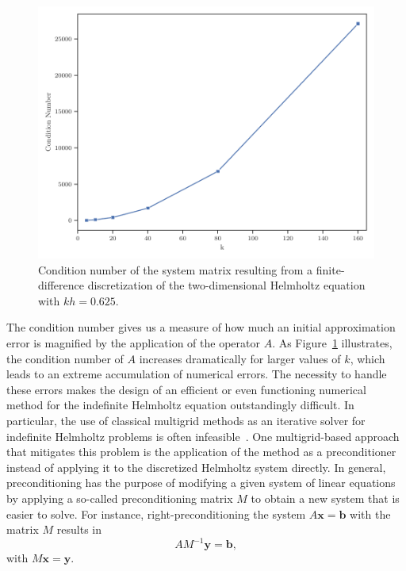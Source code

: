 \begin{figure}
		\includegraphics[scale=0.725]{figures/cond.pdf}
		\caption{Condition number of the system matrix resulting from a finite-difference discretization of the two-dimensional Helmholtz equation with $kh = 0.625$.}
		\label{fig:condition-number-helmholtz}
\end{figure}
The condition number gives us a measure of how much an initial approximation error is magnified by the application of the operator $A$.
As Figure~\ref{fig:condition-number-helmholtz} illustrates, the condition number of $A$ increases dramatically for larger values of $k$, which leads to an extreme accumulation of numerical errors. 
The necessity to handle these errors makes the design of an efficient or even functioning numerical method for the indefinite Helmholtz equation outstandingly difficult.
In particular, the use of classical multigrid methods as an iterative solver for indefinite Helmholtz problems is often infeasible~\cite{ernst2012difficult}.
One multigrid-based approach that mitigates this problem is the application of the method as a preconditioner instead of applying it to the discretized Helmholtz system directly.
In general, preconditioning has the purpose of modifying a given system of linear equations by applying a so-called preconditioning matrix $M$ to obtain a new system that is easier to solve.
For instance, right-preconditioning the system $A \bm{x} = \bm{b}$ with the matrix $M$ results in
\begin{equation}
	A M^{-1} \bm{y} = \bm{b},
	\label{eq:right-preconditioning}
\end{equation}
with $M \bm{x} = \bm{y}$. 
